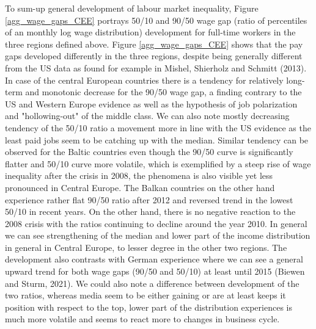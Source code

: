 \documentclass{article}
\begin{document}
To sum-up general development of labour market inequality, Figure \ref{agg_wage_gaps_CEE} portrays 50/10 and 90/50 wage gap (ratio of percentiles of an monthly log wage distribution) development for full-time workers in the three regions defined above.
Figure \ref{agg_wage_gaps_CEE} shows that the pay gaps developed differently in the three regions, despite being generally different from the US data as found for example in Mishel, Shierholz and Schmitt (2013). In case of the central European countries there is a tendency for relatively long-term and monotonic decrease for the 90/50 wage gap, a finding contrary to the US and Western Europe evidence as well as the hypothesis of job polarization and "hollowing-out" of the middle class. We can also note mostly decreasing tendency of the 50/10 ratio a movement more in line with the US evidence as the least paid jobs seem to be catching up with the median. Similar tendency can be observed for the Baltic countries even though the 90/50 curve is significantly flatter and 50/10 curve more volatile, which is exemplified by a steep rise of wage inequality after the crisis in 2008, the phenomena is also visible yet less pronounced in Central Europe. The Balkan countries on the other hand experience rather flat 90/50 ratio after 2012 and reversed trend in the lowest 50/10 in recent years. On the other hand, there is no negative reaction to the 2008 crisis with the ratios continuing to decline around the year 2010.
In general we can see strengthening of the median and lower part of the income distribution in general in Central Europe, to lesser degree in the other two regions. The development also contrasts with German experience where we can see a general upward trend for both wage gaps (90/50 and 50/10) at least until 2015 (Biewen and Sturm, 2021). We could also note a difference between development of the two ratios, whereas media seem to be either gaining or are at least keeps it position with respect to the top, lower part of the distribution experiences is much more volatile and seems to react more to changes in business cycle.
\end{document}
